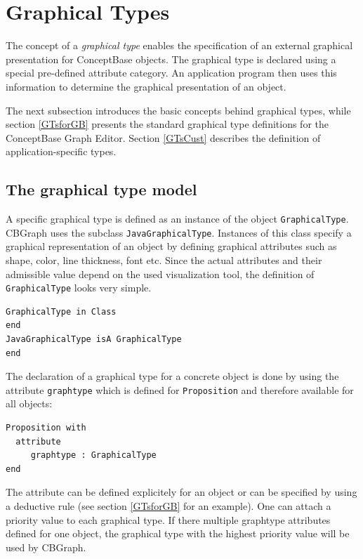 
\chapter{Graphical Types}
\label{cha:graph-typen}



The concept of a {\em graphical type} enables the specification
of an external graphical presentation for ConceptBase objects.
The graphical type is declared
using a special pre-defined attribute category.
An application program then uses this information to determine the
graphical presentation of an object.

The next subsection introduces the basic concepts behind
graphical types, while section \ref{GTsforGB} presents the
standard graphical type definitions for the ConceptBase Graph
Editor. Section \ref{GTsCust} describes the definition
of application-specific types.


\section{The graphical type model}

A specific graphical type is defined as an instance of the object
{\tt Graphical\-Type}. CBGraph uses the subclass {\tt Java\-Graphical\-Type}.
Instances of this class specify a graphical
representation of an object by defining graphical attributes such as
shape, color, line thickness, font etc. Since the
actual attributes and their admissible value depend on the
used visualization tool, the definition of {\tt Graphical\-Type} looks very simple.

{\small
\begin{verbatim}
GraphicalType in Class
end
JavaGraphicalType isA GraphicalType 
end

\end{verbatim}
}

The declaration of a graphical type for a concrete object is done
by using the attribute {\tt graphtype} which
is defined for {\tt Proposition} and therefore
available for all objects:

{\small
\begin{verbatim}
Proposition with
  attribute
     graphtype : GraphicalType
end
\end{verbatim}
}

The attribute can be defined explicitely for an object or can be specified
by using a deductive rule (see section \ref{GTsforGB} for an example).
One can attach a priority value to each
graphical type. If there multiple graphtype attributes defined for one
object, the graphical type with the highest priority value will be used
by CBGraph.

